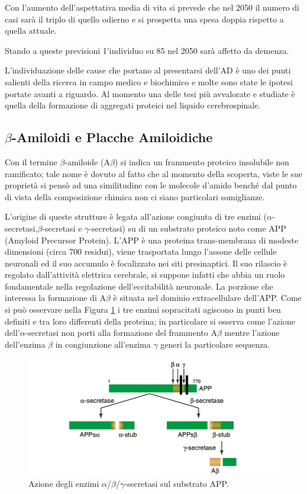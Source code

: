 \documentclass[a4paper, 12pt]{article}
\begin{document}
Con l'aumento dell'aspettativa media di vita si prevede che nel 2050 il numero di casi sarà il triplo di quello odierno e si prospetta una spesa doppia rispetto a quella attuale.\cite{noauthor_world_2018}

Stando a queste previsioni 1'individuo su 85 nel 2050 sarà affetto da demenza.

L'individuazione delle cause che portano al presentarsi dell'AD è uno dei punti salienti della ricerca in campo medico e biochimico e molte sono state le ipotesi portate avanti a riguardo. Al momento una delle tesi più avvalorate e studiate è quella della formazione di aggregati proteici nel liquido cerebrospinale.

\subsection{$\beta$-Amiloidi e Placche Amiloidiche}
\label{sec:ab}
Con il termine $\beta$-amiloide (A$\beta$) si indica un frammento proteico insolubile non ramificato; tale nome è dovuto al fatto che al momento della scoperta, viste le sue proprietà si pensò ad una similitudine con le molecole d'amido benché dal punto di vista della composizione chimica non ci siano particolari somiglianze.\cite{lennarz_encyclopedia_2004}

L'origine di queste strutture è legata all'azione congiunta di tre enzimi ($\alpha$-secretasi,$\beta$-secretasi e $\gamma$-secretasi) su di un substrato proteico noto come APP (Amyloid Precursor Protein). L'APP è una proteina trans-membrana di modeste dimensioni (circa 700 residui), viene trasportata lungo l'assone delle cellule neuronali ed il suo accumulo è focalizzato nei siti presinaptici. Il suo rilascio è regolato dall'attività elettrica cerebrale, si suppone infatti che abbia un ruolo fondamentale nella regolazione dell'eccitabilità neuronale.\cite{mattson_cellular_1997}
La porzione che interessa la formazione di A$\beta$ è situata nel dominio extracellulare dell'APP. Come si può osservare nella Figura \ref{fig:app} i tre enzimi sopracitati agiscono in punti ben definiti e tra loro differenti della proteina; in particolare si osserva come l'azione dell'$\alpha$-secretasi non porti alla formazione del frammento A$\beta$  mentre l'azione dell'enzima $\beta$ in congiunzione all'enzima $\gamma$ generi la particolare sequenza.\cite{goedert_century_2006}

\begin{figure}[H]
	\includegraphics[width=\linewidth]{immagini/APP.png}
	\caption{Azione degli enzimi $\alpha$/$\beta$/$\gamma$-secretasi sul substrato APP.}
	\label{fig:app}
\end{figure}
\end{document}
